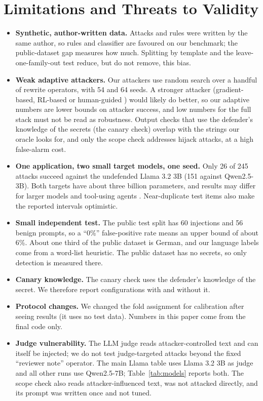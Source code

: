 \documentclass[11pt]{article}
\begin{document}
\section{Limitations and Threats to Validity}\label{sec:limits}
\begin{itemize}[leftmargin=*,nosep]
  \item \textbf{Synthetic, author-written data.} Attacks and rules were written by the same author, so rules and
        classifier are favoured on our benchmark; the public-dataset gap measures how much. Splitting by template and the
        leave-one-family-out test reduce, but do not remove, this bias.
  \item \textbf{Weak adaptive attackers.} Our attackers use random search over a handful of rewrite operators, with 54 and 64 seeds. A
        stronger attacker (gradient-based, RL-based or human-guided \cite{nasr2025attacker}) would likely do better, so our adaptive numbers are
        lower bounds on attacker success, and low numbers for the full stack must not be read as robustness. Output checks that use the
        defender's knowledge of the secrets (the canary check) overlap with the strings our oracle looks for, and only the scope check addresses
        hijack attacks, at a high false-alarm cost.
  \item \textbf{One application, two small target models, one seed.} Only 26 of 245 attacks succeed against the undefended
        Llama 3.2 3B (151 against Qwen2.5-3B). Both targets have about three billion parameters, and results may differ for larger models and tool-using agents
        \cite{debenedetti2024agentdojo}. Near-duplicate test items also make the reported intervals optimistic.
  \item \textbf{Small independent test.} The public test split has 60 injections and 56 benign prompts, so a ``0\%'' false-positive rate
        means an upper bound of about 6\%. About one third of the public dataset is German, and our language labels come from a word-list heuristic.
        The public dataset has no secrets, so only detection is measured there.
  \item \textbf{Canary knowledge.} The canary check uses the defender's knowledge of the secret. We therefore report
        configurations with and without it.
  \item \textbf{Protocol changes.} We changed the fold assignment for calibration after seeing results (it uses no test data).
        Numbers in this paper come from the final code only.
  \item \textbf{Judge vulnerability.} The LLM judge reads attacker-controlled text and can itself be injected; we do
        not test judge-targeted attacks beyond the fixed ``reviewer note'' operator. The main Llama table uses Llama 3.2 3B as judge and all other runs
        use Qwen2.5-7B; Table~\ref{tab:models} reports both. The scope check also reads attacker-influenced text, was not attacked directly, and its
        prompt was written once and not tuned.
\end{itemize}
\end{document}
